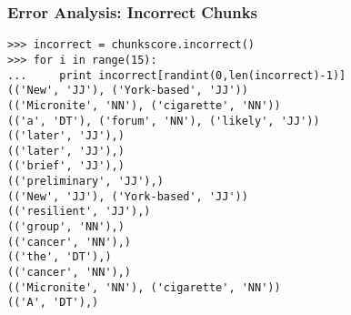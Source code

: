 \begin{frame}[fragile]\frametitle{Error Analysis: Incorrect Chunks}
  \scriptsize

\begin{lstlisting}
>>> incorrect = chunkscore.incorrect()
>>> for i in range(15):
...     print incorrect[randint(0,len(incorrect)-1)]
(('New', 'JJ'), ('York-based', 'JJ'))
(('Micronite', 'NN'), ('cigarette', 'NN'))
(('a', 'DT'), ('forum', 'NN'), ('likely', 'JJ'))
(('later', 'JJ'),)
(('later', 'JJ'),)
(('brief', 'JJ'),)
(('preliminary', 'JJ'),)
(('New', 'JJ'), ('York-based', 'JJ'))
(('resilient', 'JJ'),)
(('group', 'NN'),)
(('cancer', 'NN'),)
(('the', 'DT'),)
(('cancer', 'NN'),)
(('Micronite', 'NN'), ('cigarette', 'NN'))
(('A', 'DT'),)
\end{lstlisting}
\end{frame}

